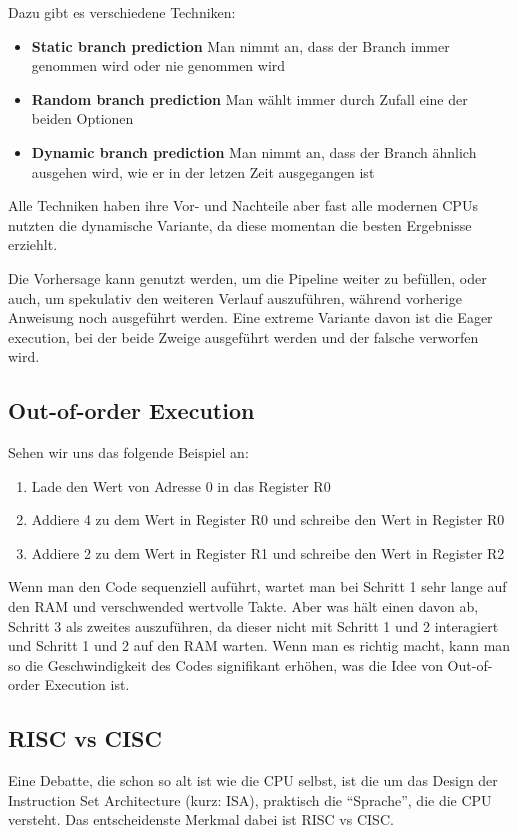 \documentclass[8pt, letterpaper]{article}
\begin{document}
Dazu gibt es verschiedene Techniken:
\begin{itemize}
  \item \textbf{Static branch prediction} Man nimmt an, dass der Branch immer genommen wird oder nie genommen wird
  \item \textbf{Random branch prediction} Man wählt immer durch Zufall eine der beiden Optionen
  \item \textbf{Dynamic branch prediction} Man nimmt an, dass der Branch ähnlich ausgehen wird, wie er in der letzen Zeit ausgegangen ist
\end{itemize}

Alle Techniken haben ihre Vor- und Nachteile aber fast alle modernen CPUs nutzten die dynamische Variante, da diese momentan die besten Ergebnisse erziehlt.

Die Vorhersage kann genutzt werden, um die Pipeline weiter zu befüllen, oder auch, um spekulativ den weiteren Verlauf auszuführen, während vorherige Anweisung noch ausgeführt werden. Eine extreme Variante davon ist die Eager execution, bei der beide Zweige ausgeführt werden und der falsche verworfen wird.

\subsection{Out-of-order Execution}\cite{wiki-oooe}
Sehen wir uns das folgende Beispiel an:
\begin{enumerate}
  \item Lade den Wert von Adresse 0 in das Register R0
  \item Addiere 4 zu dem Wert in Register R0 und schreibe den Wert in Register R0
  \item Addiere 2 zu dem Wert in Register R1 und schreibe den Wert in Register R2
\end{enumerate}

Wenn man den Code sequenziell auführt, wartet man bei Schritt 1 sehr lange auf den RAM und verschwended wertvolle Takte. Aber was hält einen davon ab, Schritt 3 als zweites auszuführen, da dieser nicht mit Schritt 1 und 2 interagiert und Schritt 1 und 2 auf den RAM warten. Wenn man es richtig macht, kann man so die Geschwindigkeit des Codes signifikant erhöhen, was die Idee von Out-of-order Execution ist.

\subsection{RISC vs CISC}\cite{wiki-isa}
Eine Debatte, die schon so alt ist wie die CPU selbst, ist die um das Design der Instruction Set Architecture (kurz: ISA), praktisch die ``Sprache'', die die CPU versteht. Das entscheidenste Merkmal dabei ist RISC vs CISC.
\end{document}
